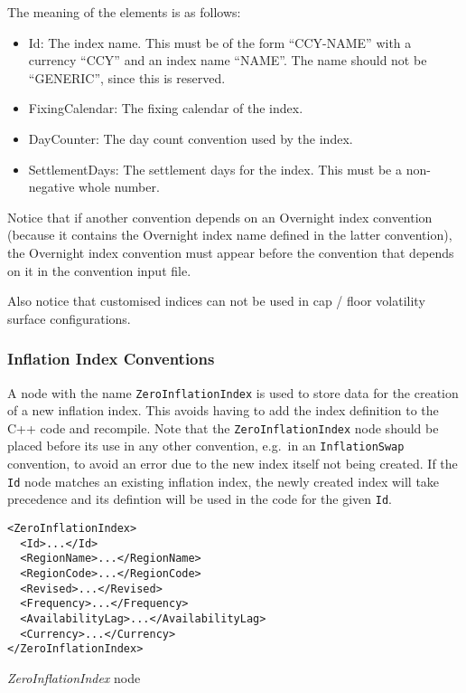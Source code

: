 The meaning of the elements is as follows:

\begin{itemize}
\item Id: The index name. This must be of the form ``CCY-NAME'' with a currency ``CCY'' and an index name ``NAME''. The
  name should not be ``GENERIC'', since this is reserved.
\item FixingCalendar: The fixing calendar of the index.
\item DayCounter: The day count convention used by the index.
\item SettlementDays: The settlement days for the index. This must be a non-negative whole number.
\end{itemize}

Notice that if another convention depends on an Overnight index convention (because it contains the Overnight index name
defined in the latter convention), the Overnight index convention must appear before the convention that depends on it
in the convention input file.

Also notice that customised indices can not be used in cap / floor volatility surface configurations.

\subsubsection{Inflation Index Conventions}
A node with the name \lstinline!ZeroInflationIndex! is used to store data for the creation of a new inflation index. This avoids having to add the index definition to the C++ code and recompile. Note that the \lstinline!ZeroInflationIndex! node should be placed before its use in any other convention, e.g.\ in an \lstinline!InflationSwap! convention, to avoid an error due to the new index itself not being created. If the \lstinline!Id! node matches an existing inflation index, the newly created index will take precedence and its defintion will be used in the code for the given \lstinline!Id!.

\begin{listing}[H]
\begin{verbatim}
<ZeroInflationIndex>
  <Id>...</Id>
  <RegionName>...</RegionName>
  <RegionCode>...</RegionCode>
  <Revised>...</Revised>
  <Frequency>...</Frequency>
  <AvailabilityLag>...</AvailabilityLag>
  <Currency>...</Currency>
</ZeroInflationIndex>
\end{verbatim}
\caption{\emph{ZeroInflationIndex} node}
\label{lst:zero_inflation_index_conventions}
\end{listing}

